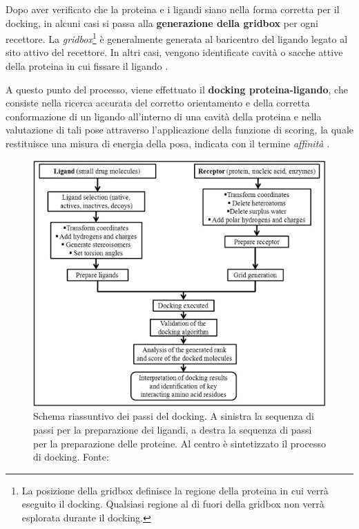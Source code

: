 Dopo aver verificato che la proteina e i ligandi siano nella forma corretta per il docking, in alcuni casi si passa alla \textbf{generazione della gridbox} per ogni recettore. La \textit{gridbox}\footnote{La posizione della gridbox definisce la regione della proteina in cui verrà eseguito il docking. Qualsiasi regione al di fuori della gridbox non verrà esplorata durante il docking.} è generalmente generata al baricentro del ligando legato al sito attivo del recettore. 
In altri casi, vengono identificate cavità o sacche attive della proteina in cui fissare il ligando \cite{roy_chapter_2015}.

A questo punto del processo, viene effettuato il \textbf{docking proteina-ligando}, che consiste nella ricerca accurata del corretto orientamento e della corretta conformazione di un ligando all'interno di una cavità della proteina e nella valutazione di tali pose attraverso l'applicazione della funzione di scoring, la quale restituisce una misura di energia della posa, indicata con il termine \textit{affinità} \cite{roy_chapter_2015}.

\begin{figure}[h]
    \centering
    \includegraphics[scale=0.7]{images/docking_steps.jpg}
    \caption[Schema riassuntivo dei passi del docking.]{Schema riassuntivo dei passi del docking. A sinistra la sequenza di passi per la preparazione dei ligandi, a destra la sequenza di passi per la preparazione delle proteine. Al centro è sintetizzato il processo di docking. Fonte: \cite{roy_chapter_2015}}
    \label{fig:docking_steps}
\end{figure}

